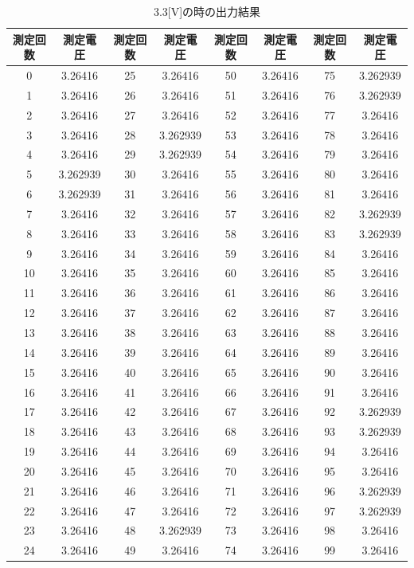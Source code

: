 \documentclass[11pt,dvipdfmx]{jarticle}
\begin{document}
		\begin{table}[b]
			\centering
			\caption{3.3[V]の時の出力結果}
			\label{tab:3.3}
			\begin{tabular}{|c|c|c|c|c|c|c|c|}
				\hline
			測定回数&測定電圧&測定回数&測定電圧&測定回数&測定電圧&測定回数&測定電圧\\
			\hline
			0  & 3.26416  & 25 & 3.26416  & 50 & 3.26416 & 75 & 3.262939 \\
			1  & 3.26416  & 26 & 3.26416  & 51 & 3.26416 & 76 & 3.262939 \\
			2  & 3.26416  & 27 & 3.26416  & 52 & 3.26416 & 77 & 3.26416  \\
			3  & 3.26416  & 28 & 3.262939 & 53 & 3.26416 & 78 & 3.26416  \\
			4  & 3.26416  & 29 & 3.262939 & 54 & 3.26416 & 79 & 3.26416  \\
			5  & 3.262939 & 30 & 3.26416  & 55 & 3.26416 & 80 & 3.26416  \\
			6  & 3.262939 & 31 & 3.26416  & 56 & 3.26416 & 81 & 3.26416  \\
			7  & 3.26416  & 32 & 3.26416  & 57 & 3.26416 & 82 & 3.262939 \\
			8  & 3.26416  & 33 & 3.26416  & 58 & 3.26416 & 83 & 3.262939 \\
			9  & 3.26416  & 34 & 3.26416  & 59 & 3.26416 & 84 & 3.26416  \\
			10 & 3.26416  & 35 & 3.26416  & 60 & 3.26416 & 85 & 3.26416  \\
			11 & 3.26416  & 36 & 3.26416  & 61 & 3.26416 & 86 & 3.26416  \\
			12 & 3.26416  & 37 & 3.26416  & 62 & 3.26416 & 87 & 3.26416  \\
			13 & 3.26416  & 38 & 3.26416  & 63 & 3.26416 & 88 & 3.26416  \\
			14 & 3.26416  & 39 & 3.26416  & 64 & 3.26416 & 89 & 3.26416  \\
			15 & 3.26416  & 40 & 3.26416  & 65 & 3.26416 & 90 & 3.26416  \\
			16 & 3.26416  & 41 & 3.26416  & 66 & 3.26416 & 91 & 3.26416  \\
			17 & 3.26416  & 42 & 3.26416  & 67 & 3.26416 & 92 & 3.262939 \\
			18 & 3.26416  & 43 & 3.26416  & 68 & 3.26416 & 93 & 3.262939 \\
			19 & 3.26416  & 44 & 3.26416  & 69 & 3.26416 & 94 & 3.26416  \\
			20 & 3.26416  & 45 & 3.26416  & 70 & 3.26416 & 95 & 3.26416  \\
			21 & 3.26416  & 46 & 3.26416  & 71 & 3.26416 & 96 & 3.262939 \\
			22 & 3.26416  & 47 & 3.26416  & 72 & 3.26416 & 97 & 3.262939 \\
			23 & 3.26416  & 48 & 3.262939 & 73 & 3.26416 & 98 & 3.26416  \\
			24 & 3.26416  & 49 & 3.26416  & 74 & 3.26416 & 99 & 3.26416 \\
			\hline
			\end{tabular}
			\end{table}
\end{document}
